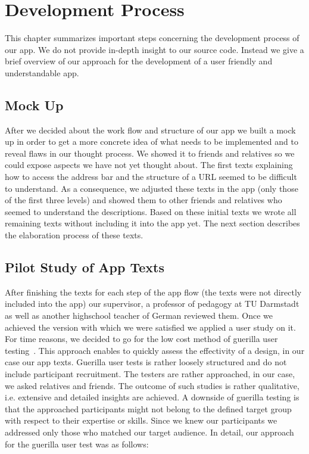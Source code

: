 
\section{Development Process}
This chapter summarizes important steps concerning the development process of our app.
We do not provide in-depth insight to our source code. 
Instead we give a brief overview of our approach for the development of a user friendly and understandable app.
\subsection{Mock Up}
After we decided about the work flow and structure of our app we built a mock up in order to get a more concrete idea of what needs to be implemented and to reveal flaws in our thought process.
We showed it to friends and relatives so we could expose aspects we have not yet thought about.
The first texts explaining how to access the address bar and the structure of a URL seemed to be difficult to understand.
As a consequence, we adjusted these texts in the app (only those of the first three levels) and showed them to other friends and relatives who seemed to understand the descriptions.
Based on these initial texts we wrote all remaining texts without including it into the app yet.
The next section describes the elaboration process of these texts.
\subsection{Pilot Study of App Texts}
\label{s:pilot_study}
After finishing the texts for each step of the app flow (the texts were not directly included into the app) our supervisor, a professor of pedagogy at TU Darmstadt as well as another highschool teacher of German reviewed them.
Once we achieved the version with which we were satisfied we applied a user study on it. 
For time reasons, we decided to go for the low cost method of guerilla user testing~\cite{guerillagovuk, guerillauxbooth}.
This approach enables to quickly assess the effectivity of a design, in our case our app texts.
Guerilla user tests is rather loosely structured and do not include participant recruitment.
The testers are rather approached, in our case, we asked relatives and friends. 
The outcome of such studies is rather qualitative, i.e. extensive and detailed insights are achieved.
A downside of guerilla testing is that the approached participants might not belong to the defined target group with respect to their expertise or skills. 
Since we knew our participants we addressed only those who matched our target audience. 
In detail, our approach for the guerilla user test was as follows:


